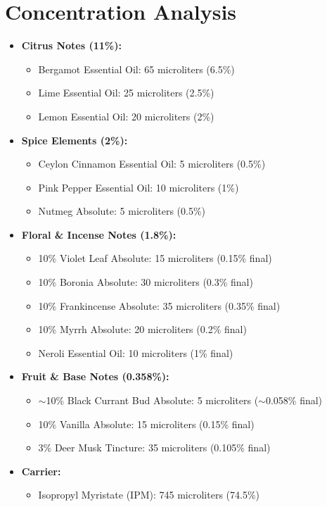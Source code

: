 \documentclass{article}
\begin{document}
\section*{Concentration Analysis}
\begin{itemize}[leftmargin=*]
  \item \textcolor{colaRed}{\textbf{Citrus Notes (11\%):}}
  \begin{itemize}
    \item Bergamot Essential Oil: 65 microliters (6.5\%)
    \item Lime Essential Oil: 25 microliters (2.5\%)
    \item Lemon Essential Oil: 20 microliters (2\%)
  \end{itemize}
  
  \item \textcolor{colaRed}{\textbf{Spice Elements (2\%):}}
  \begin{itemize}
    \item Ceylon Cinnamon Essential Oil: 5 microliters (0.5\%)
    \item Pink Pepper Essential Oil: 10 microliters (1\%)
    \item Nutmeg Absolute: 5 microliters (0.5\%)
  \end{itemize}
  
  \item \textcolor{violetPurple}{\textbf{Floral \& Incense Notes (1.8\%):}}
  \begin{itemize}
    \item 10\% Violet Leaf Absolute: 15 microliters (0.15\% final)
    \item 10\% Boronia Absolute: 30 microliters (0.3\% final)
    \item 10\% Frankincense Absolute: 35 microliters (0.35\% final)
    \item 10\% Myrrh Absolute: 20 microliters (0.2\% final)
    \item Neroli Essential Oil: 10 microliters (1\% final)
  \end{itemize}
  
  \item \textcolor{colaBrown}{\textbf{Fruit \& Base Notes (0.358\%):}}
  \begin{itemize}
    \item $\sim$10\% Black Currant Bud Absolute: 5 microliters ($\sim$0.058\% final)
    \item 10\% Vanilla Absolute: 15 microliters (0.15\% final)
    \item 3\% Deer Musk Tincture: 35 microliters (0.105\% final)
  \end{itemize}
  
  \item \textcolor{colaBrown}{\textbf{Carrier:}}
  \begin{itemize}
    \item Isopropyl Myristate (IPM): 745 microliters (74.5\%)
  \end{itemize}
\end{itemize}
\end{document}
